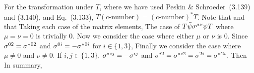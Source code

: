 {	For the transformation under $T$,
	where we have used Peskin \& Schroeder~(3.139) and (3.140),
	and Eq.~(3.133), $T (\text{c-number}) = (\text{c-number})^* T$.  Note that
	and that
	Taking each case of the matrix elements,
	The case of $T \bar{\psi} \sigma^{\mu \nu} \psi T$ where $\mu = \nu = 0$ is trivially 0.  Now we consider the case where either $\mu$ or $\nu$ is 0.  Since $\sigma^{0 2} = \sigma^*{}^{0 2}$ and $\sigma^{0 i} = -\sigma^*{}^{0 i}$ for $i \in \{1, 3\}$,
	Finally we consider the case where $\mu \neq 0$ and $\nu \neq 0$.  If $i, j \in \{1, 3\}$, $\sigma^*{}^{i j} = -\sigma^{i j}$ and $\sigma^{i 2} = \sigma^*{}^{i 2} = \sigma^{2 i} = \sigma^*{}^{2 i}$.  Then
	In summary,
	
}
